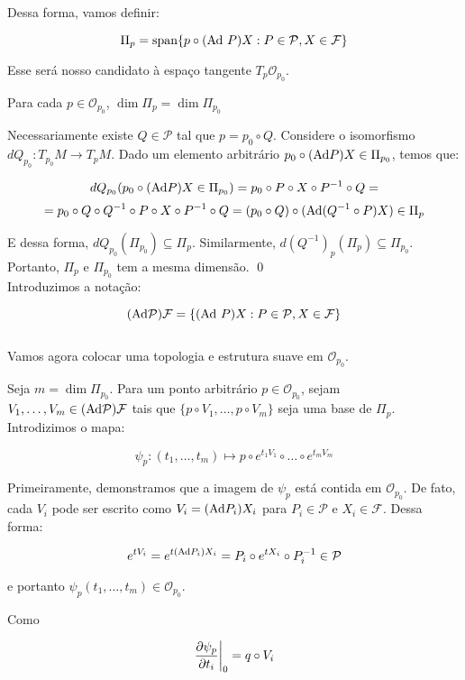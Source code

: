 Dessa forma, vamos definir:

$$\Pi_p = \text{span} \{ p  \circ (\text{Ad}\ P) X : P \in \mathcal{P}, X \in \mathcal{F}\}$$

Esse será nosso candidato à espaço tangente $T_p \mathcal{O}_{p_0}$.

\begin{lemma}
    Para cada $p \in \mathcal{O}_{p_0}$, $\dim \Pi_p = \dim \Pi_{p_0}$
\end{lemma}

\dem Necessariamente existe $Q \in \mathcal{P}$ tal que $p = p_0 \circ Q$.
Considere o isomorfismo $dQ_{p_0}:T_{p_0}M \to T_p M$. Dado um elemento
arbitrário $p_0 \circ (\text{Ad} P) X \in \Pi_{p_0}$, temos que:

$$dQ_{p_0}(p_0 \circ (\text{Ad} P) X \in \Pi_{p_0}) = 
p_0 \circ P \circ X \circ P^{-1} \circ Q =$$
$$= p_0 \circ Q \circ Q^{-1} \circ P \circ X
\circ P^{-1} \circ Q = (p_0 \circ Q) \circ (\text{Ad}(Q^{-1} \circ P) X) \in \Pi_p$$

E dessa forma, $dQ_{p_0}(\Pi_{p_0}) \subseteq \Pi_p$. Similarmente,
$d(Q^{-1})_p(\Pi_p) \subseteq \Pi_{p_0}$. Portanto, $\Pi_p$ e $\Pi_{p_0}$
tem a mesma dimensão. \qed\\

Introduzimos a notação:

$$(\Ad \mathcal{P})\mathcal{F} = \{(\Ad\ P) X : P \in \mathcal{P}, X \in \mathcal{F}\}$$\\

Vamos agora colocar uma topologia e estrutura suave em $\mathcal{O}_{p_0}$.

Seja $m = \dim \Pi_{p_0}$. Para um ponto arbitrário $p \in \mathcal{O}_{p_0}$,
sejam $V_1, \dots, V_m \in (\text{Ad} \mathcal{P})\mathcal{F}$ tais que
$\{p \circ V_1, \dots, p \circ V_m\}$ seja uma base de $\Pi_p$. Introdizimos o mapa:

$$\psi_p : (t_1, \dots, t_m) \mapsto p \circ e^{t_1V_1} \circ \dots \circ e^{t_mV_m}$$

Primeiramente, demonstramos que a imagem de $\psi_p$ está contida em $\mathcal{O}_{p_0}$.
De fato, cada $V_i$ pode ser escrito como $V_i = (\text{Ad} P_i) X_i$ para $P_i \in \mathcal{P}$
e $X_i \in \mathcal{F}$. Dessa forma:

$$e^{tV_i} = e^{t (\text{Ad} P_i) X_i} = P_i \circ e^{t X_i} \circ P_i^{-1} \in \mathcal{P}$$

e portanto $\psi_p(t_1,\dots,t_m) \in \mathcal{O}_{p_0}$.

Como

$$\frac{\partial \psi_p}{\partial t_i}\bigg|_0 = q \circ V_i$$

